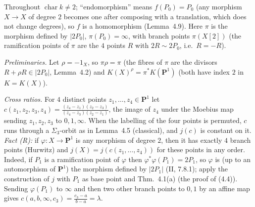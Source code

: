 \documentclass[11pt]{article}
\begin{document}
\pf
Throughout $\operatorname{char}k\ne2$; ``endomorphism'' means $f(P_0)=P_0$ (any morphism $X\to X$ of degree $2$ becomes one after composing with a translation, which does not change degrees), so $f$ is a homomorphism (Lemma~4.9). Here $\pi$ is the morphism defined by $|2P_0|$, $\pi(P_0)=\infty$, with branch points $\pi(X[2])$ (the ramification points of $\pi$ are the $4$ points $R$ with $2R\sim2P_0$, i.e.\ $R=-R$).

\emph{Preliminaries.} Let $\rho=-1_X$, so $\pi\rho=\pi$ (the fibres of $\pi$ are the divisors $R+\rho R\in|2P_0|$, Lemma~4.2) and $K(X)^{\rho}=\pi^*K(\mathbf P^1)$ (both have index $2$ in $K=K(X)$).

\emph{Cross ratios.} For $4$ distinct points $z_1,\dots,z_4\in\mathbf P^1$ let $c(z_1,z_2,z_3,z_4)=\frac{(z_4-z_1)(z_2-z_3)}{(z_4-z_3)(z_2-z_1)}$, the image of $z_4$ under the Moebius map sending $z_1,z_2,z_3$ to $0,1,\infty$. When the labelling of the four points is permuted, $c$ runs through a $\Sigma_3$-orbit as in Lemma~4.5 (classical), and $j(c)$ is constant on it. \emph{Fact (R):} if $\varphi:X\to\mathbf P^1$ is any morphism of degree $2$, then it has exactly $4$ branch points (Hurwitz) and $j(X)=j(c(z_1,\dots,z_4))$ for these points in any order. Indeed, if $P_1$ is a ramification point of $\varphi$ then $\varphi^*\varphi(P_1)=2P_1$, so $\varphi$ is (up to an automorphism of $\mathbf P^1$) the morphism defined by $|2P_1|$ (II, 7.8.1); apply the construction of $j$ with $P_1$ as base point and Thm.~4.1(a) (the proof of (4.4)). Sending $\varphi(P_1)$ to $\infty$ and then two other branch points to $0,1$ by an affine map gives $c(a,b,\infty,c_3)=\frac{c_3-a}{b-a}=\lambda$.
\end{document}
